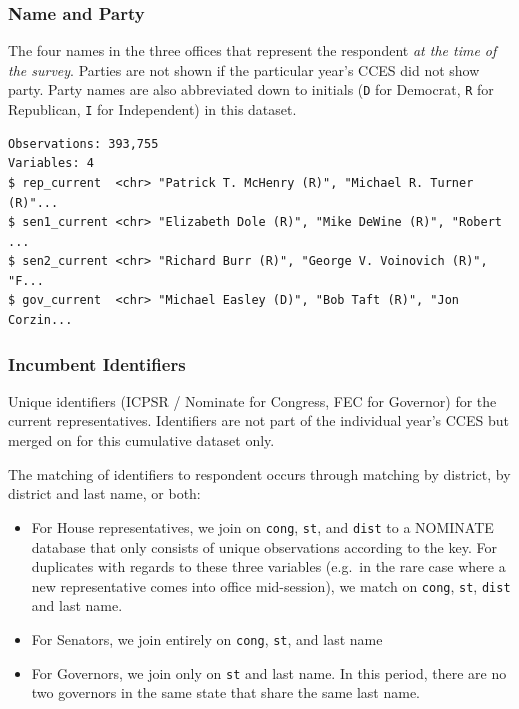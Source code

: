 \documentclass[10pt,article,oneside]{memoir}
\theoremstyle{definition}
\begin{document}
\hypertarget{name-and-party}{%
\subsubsection{Name and Party}\label{name-and-party}}

The four names in the three offices that represent the respondent
\emph{at the time of the survey}. Parties are not shown if the
particular year's CCES did not show party. Party names are also
abbreviated down to initials (\texttt{D} for Democrat, \texttt{R} for
Republican, \texttt{I} for Independent) in this dataset.

\begin{verbatim}
Observations: 393,755
Variables: 4
$ rep_current  <chr> "Patrick T. McHenry (R)", "Michael R. Turner (R)"...
$ sen1_current <chr> "Elizabeth Dole (R)", "Mike DeWine (R)", "Robert ...
$ sen2_current <chr> "Richard Burr (R)", "George V. Voinovich (R)", "F...
$ gov_current  <chr> "Michael Easley (D)", "Bob Taft (R)", "Jon Corzin...
\end{verbatim}

\hypertarget{incumbent-identifiers}{%
\subsubsection{Incumbent Identifiers}\label{incumbent-identifiers}}

Unique identifiers (ICPSR / Nominate for Congress, FEC for Governor) for
the current representatives. Identifiers are not part of the individual
year's CCES but merged on for this cumulative dataset only.

The matching of identifiers to respondent occurs through matching by
district, by district and last name, or both:

\begin{itemize}
\tightlist
\item
  For House representatives, we join on \texttt{cong}, \texttt{st}, and
  \texttt{dist} to a NOMINATE database that only consists of unique
  observations according to the key. For duplicates with regards to
  these three variables (e.g.~in the rare case where a new
  representative comes into office mid-session), we match on
  \texttt{cong}, \texttt{st}, \texttt{dist} and last name.
\item
  For Senators, we join entirely on \texttt{cong}, \texttt{st}, and last
  name
\item
  For Governors, we join only on \texttt{st} and last name. In this
  period, there are no two governors in the same state that share the
  same last name.
\end{itemize}
\end{document}
